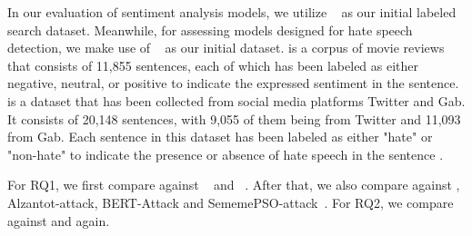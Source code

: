 
 In our evaluation of sentiment analysis models, we utilize \Sst~\cite{socher2013sst} as our initial labeled search dataset. Meanwhile, for assessing models designed for hate speech detection, we make use of \Hatexp~\cite{mathew2021hatexplain} as our initial dataset.
\Sst is a corpus of movie reviews that consists of 11,855 sentences, each of which has been labeled as either negative, neutral, or positive to indicate the expressed sentiment in the sentence.
\Hatexp is a dataset that has been collected from social media platforms Twitter and Gab. It consists of 20,148 sentences, with 9,055 of them being from Twitter and 11,093 from Gab. Each sentence in this dataset has been labeled as either "hate" or "non-hate" to indicate the presence or absence of hate speech in the sentence \cite{mathew2021hatexplain}.




\MyPara{\Bls}
\label{sec:experiment_bl}
For RQ1, we first compare \tool against \Cklst~\cite{marcoACL2020checklist} and \hck~\cite{rottger2020hatecheck}. After that, we also compare \tool against \mtnlp, Alzantot-attack, BERT-Attack and SememePSO-attack~\cite{maIJCAI2020mtnlp,alzantot2018genadvexp,linyang2020bertattack,zang2020sememepso}.
For RQ2, we compare \tool against \Cklst and \hck again.

